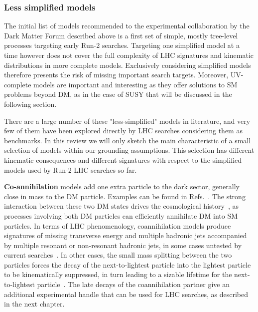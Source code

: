 
\subsubsection{Less simplified models}
\label{sec:LessSimplifiedModels}

The initial list of models recommended to the experimental collaboration by the Dark Matter Forum described above is a first set of simple, mostly tree-level processes targeting early Run-2 searches. Targeting one simplified model at a time however does not cover the full complexity of LHC signatures and kinematic distributions in more complete models. Exclusively considering simplified models therefore presents the risk of missing important search targets. Moreover, UV-complete models are important and interesting as they offer solutions to SM problems beyond DM, as in the case of SUSY that will be discussed in the following section. 

There are a large number of these "less-simplified" models in literature, and very few of them have been explored directly by LHC searches considering them as benchmarks. In this review we will only sketch the main characteristic of a small selection of models within our grounding assumptions. This selection has different kinematic consequences and different signatures with respect to the simplified models used by Run-2 LHC searches so far. 

\textbf{Co-annihilation} models add one extra particle to the dark sector, generally close in mass to the DM particle. Examples can be found in Refs.~\cite{Buschmann:2016hkc,Baker:2015qna,Khoze:2017ixx}. The strong interaction between these two DM states drives the cosmological history~\cite{PlehnLecturesDM}, as processes involving both DM particles can efficiently annihilate DM into SM particles. In terms of LHC phenomenology, coannihilation models produce signatures of missing transverse energy and multiple hadronic jets accompanied by multiple resonant or non-resonant hadronic jets, in some cases untested by current searches~\cite{Buschmann:2016hkc}. In other cases, the small mass splitting between the two particles forces the decay of the next-to-lightest particle into the lightest particle to be kinematically suppressed, in turn leading to a sizable lifetime for the next-to-lightest particle~\cite{Khoze:2017ixx}. The late decays of the coannihilation partner give an additional experimental handle that can be used for LHC searches, as described in the next chapter.  

